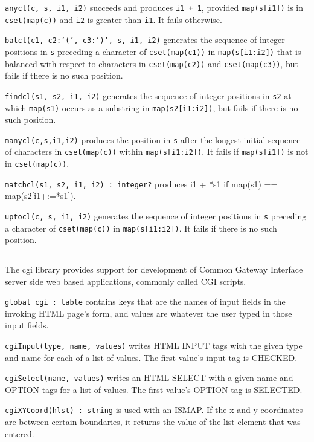 \texttt{anycl(c, s, i1, i2)} succeeds and produces \texttt{i1 + 1},
provided \texttt{map(s[i1])} is in \texttt{cset(map(c))} and
\texttt{i2} is greater than \texttt{i1}. It fails otherwise.

\texttt{balcl(c1, c2:'(',
c3:')', s, i1, i2)} generates the
sequence of integer positions in \texttt{s} preceding a character of
\texttt{cset(map(c1))} in \texttt{map(s[i1:i2])} that is balanced with
respect to characters in \texttt{cset(map(c2))} and
\texttt{cset(map(c3))}, but fails if there is no such position.

\texttt{findcl(s1, s2, i1, i2)} generates the sequence of integer
positions in \texttt{s2} at which \texttt{map(s1)} occurs as a
substring in \texttt{map(s2[i1:i2])}, but fails if there is no such
position.

\texttt{manycl(c,s,i1,i2)} produces the position in \texttt{s} after the
longest initial sequence of characters in \texttt{cset(map(c))} within
\texttt{map(s[i1:i2])}. It fails if \texttt{map(s[i1])} is not in
\texttt{cset(map(c))}.

\texttt{matchcl(s1, s2, i1, i2) : integer?} produces i1 + *s1 if map(s1)
== map(s2[i1+:=*s1]).

\texttt{uptocl(c, s, i1, i2)} generates the sequence of integer
positions in \texttt{s} preceding a character of \texttt{cset(map(c))}
in \texttt{map(s[i1:i2])}. It fails if there is no such position.

\vspace{0.25cm}\hrule{}

The cgi library provides support for development of Common Gateway
Interface server side web based applications, commonly called
CGI scripts.

\texttt{global cgi : table} contains keys that are
the names of input fields in the invoking HTML page's
form, and values are whatever the user typed in those input fields. 

\texttt{cgiInput(type, name, values)} writes HTML INPUT tags
with the given type and name for each of a list of
values. The first value's input tag is CHECKED. 

\texttt{cgiSelect(name, values)} writes an HTML SELECT with a
given name and OPTION tags for a list of
values. The first value's OPTION tag is SELECTED. 

\texttt{cgiXYCoord(hlst) : string} is used with an ISMAP.
If the x and y coordinates are between certain boundaries, it returns
the value of the list element that was entered. 

